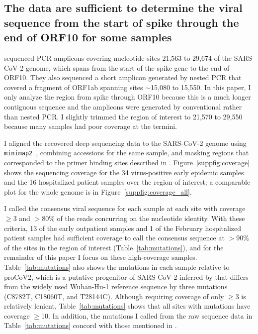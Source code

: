 \documentclass[9pt,twocolumn,twoside]{gsajnl_modified}
\begin{document}
\subsection{The data are sufficient to determine the viral sequence from the start of spike through the end of ORF10 for some samples}
\citet{wang2020medRxiv} sequenced PCR amplicons covering nucleotide sites 21,563 to 29,674 of the SARS-CoV-2 genome, which spans from the start of the spike gene to the end of ORF10.
They also sequenced a short amplicon generated by nested PCR that covered a fragment of ORF1ab spanning sites $\sim$15,080 to 15,550.
In this paper, I only analyze the region from spike through ORF10 because this is a much longer contiguous sequence and the amplicons were generated by conventional rather than nested PCR.
I slightly trimmed the region of interest to 21,570 to 29,550 because many samples had poor coverage at the termini.

I aligned the recovered deep sequencing data to the SARS-CoV-2 genome using \texttt{minimap2}~\citep{li2018minimap2}, combining accessions for the same sample, and masking regions that corresponded to the primer binding sites described in \citet{wang2020medRxiv}.
Figure~\ref{suppfig:coverage} shows the sequencing coverage for the 34 virus-positive early epidemic samples and the 16 hospitalized patient samples over the region of interest; a comparable plot for the whole genome is in Figure~\ref{suppfig:coverage_all}.

I called the consensus viral sequence for each sample at each site with coverage $\ge$3 and $>$80\% of the reads concurring on the nucleotide identity.
With these criteria, 13 of the early outpatient samples and 1 of the February hospitalized patient samples had sufficient coverage to call the consensus sequence at $>$90\% of the sites in the region of interest (Table~\ref{tab:mutations}), and for the remainder of this paper I focus on these high-coverage samples.
Table~\ref{tab:mutations} also shows the mutations in each sample relative to proCoV2, which is a putative progenitor of SARS-CoV-2 inferred by \citet{kumar2021evolutionary} that differs from the widely used Wuhan-Hu-1 reference sequence by three mutations (C8782T, C18060T, and T28144C).
Although requiring coverage of only $\ge$3 is relatively lenient, Table~\ref{tab:mutations} shows that all sites with mutations have coverage $\ge$10.
In addition, the mutations I called from the raw sequence data in Table~\ref{tab:mutations} concord with those mentioned in \citet{wang2020small}.
\end{document}
